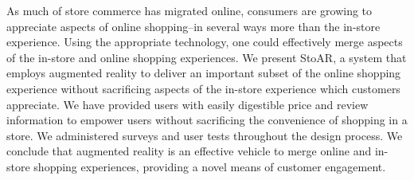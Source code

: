 As much of store commerce has migrated online, consumers are growing to appreciate aspects of online shopping--in several ways more than the in-store experience.  Using the appropriate technology, one could effectively merge aspects of the in-store and online shopping experiences.  We present StoAR, a system that employs augmented reality to deliver an important subset of the online shopping experience without sacrificing aspects of the in-store experience which customers appreciate.  We have provided users with easily digestible price and review information to empower users without sacrificing the convenience of shopping in a store.  We administered surveys and user tests throughout the design process.  We conclude that augmented reality is an effective vehicle to merge online and in-store shopping experiences, providing a novel means of customer engagement.
